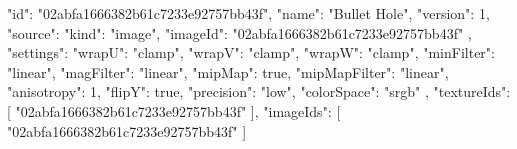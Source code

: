 {
  "id": "02abfa1666382b61c7233e92757bb43f",
  "name": "Bullet Hole",
  "version": 1,
  "source": {
    "kind": "image",
    "imageId": "02abfa1666382b61c7233e92757bb43f"
  },
  "settings": {
    "wrapU": "clamp",
    "wrapV": "clamp",
    "wrapW": "clamp",
    "minFilter": "linear",
    "magFilter": "linear",
    "mipMap": true,
    "mipMapFilter": "linear",
    "anisotropy": 1,
    "flipY": true,
    "precision": "low",
    "colorSpace": "srgb"
  },
  "textureIds": [
    "02abfa1666382b61c7233e92757bb43f"
  ],
  "imageIds": [
    "02abfa1666382b61c7233e92757bb43f"
  ]
}

